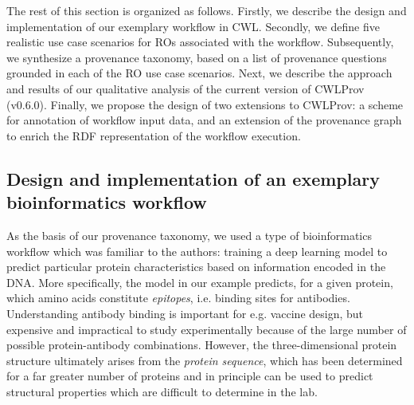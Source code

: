 The rest of this section is organized as follows. Firstly, we describe the design and implementation of our exemplary workflow in CWL. Secondly, we define five realistic use case scenarios for ROs associated with the workflow. Subsequently, we synthesize a provenance taxonomy, based on a list of provenance questions grounded in each of the RO use case scenarios. Next, we describe the approach and results of our qualitative analysis of the current version of CWLProv (v0.6.0). Finally, we propose the design of two extensions to CWLProv: a scheme for annotation of workflow input data, and an extension of the provenance graph to enrich the RDF representation of the workflow execution. 

\subsection{Design and implementation of an exemplary bioinformatics workflow}
\label{sec:workflow}



As the basis of our provenance taxonomy, we used a type of bioinformatics workflow which was familiar to the authors: training a deep learning model to predict particular protein characteristics based on information encoded in the DNA. %
More specifically, the model in our example predicts, for a given protein, which amino acids constitute \emph{epitopes}, i.e. binding sites for antibodies. Understanding antibody binding is important for e.g. vaccine design, but expensive and impractical to study experimentally because of the large number of possible protein-antibody combinations. However, the three-dimensional protein structure ultimately arises from the \emph{protein sequence}, which has been determined for a far greater number of proteins and in principle can be used to predict structural properties which are difficult to determine in the lab.

